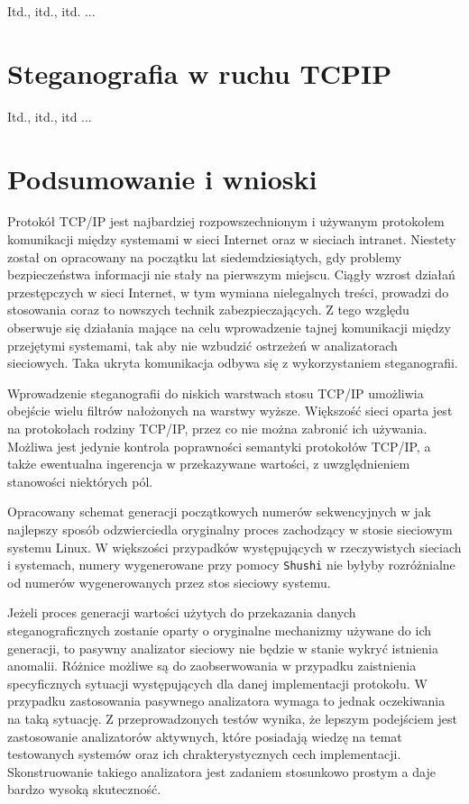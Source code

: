 \documentclass[a4paper,12pt,twoside,openany]{report}
\newcommand{\tech}{\texttt}
\begin{document}
Itd., itd., itd. ...

\chapter{Steganografia w ruchu TCPIP}
\label{chapterSteganografiaWRuchuTCPIP}

Itd., itd., itd ...
\fi
\chapter{Podsumowanie i wnioski }

\iffalse
Protokół TCP/IP jest najbardziej rozpowszechnionym i używanym protokołem 
komunikacji między systemami w sieci Internet oraz w sieciach intranet. Niestety 
został on opracowany na początku lat siedemdziesiątych, gdy problemy 
bezpieczeństwa informacji nie stały na pierwszym miejscu. Ciągły wzrost działań 
przestępczych w sieci Internet, w tym wymiana nielegalnych treści, prowadzi do 
stosowania coraz to nowszych technik zabezpieczających. Z tego względu obserwuje 
się działania mające na celu wprowadzenie tajnej komunikacji między przejętymi 
systemami, tak aby nie wzbudzić ostrzeżeń w analizatorach sieciowych. Taka 
ukryta komunikacja odbywa się z wykorzystaniem steganografii.

Wprowadzenie steganografii do niskich warstwach stosu TCP/IP umożliwia obejście 
wielu filtrów nałożonych na warstwy wyższe. Większość sieci oparta jest na 
protokołach rodziny TCP/IP, przez co nie można zabronić ich używania. Możliwa 
jest jedynie kontrola poprawności semantyki protokołów TCP/IP, a także 
ewentualna ingerencja w przekazywane wartości, z uwzględnieniem stanowości 
niektórych pól.

Opracowany schemat generacji początkowych numerów sekwencyjnych w jak najlepszy 
sposób odzwierciedla oryginalny proces zachodzący w stosie sieciowym systemu 
Linux. W większości przypadków występujących w rzeczywistych sieciach i 
systemach, numery wygenerowane przy pomocy \tech{Shushi} nie byłyby rozróżnialne 
od numerów wygenerowanych przez stos sieciowy systemu.

Jeżeli proces generacji wartości użytych do przekazania danych 
steganograficznych zostanie oparty o oryginalne mechanizmy używane do ich 
generacji, to pasywny analizator sieciowy nie będzie w stanie wykryć istnienia 
anomalii. Różnice możliwe są do zaobserwowania w przypadku zaistnienia 
specyficznych sytuacji występujących dla danej implementacji protokołu. W 
przypadku zastosowania pasywnego analizatora wymaga to jednak oczekiwania na 
taką sytuację. Z przeprowadzonych testów wynika, że lepszym podejściem jest 
zastosowanie analizatorów aktywnych, które posiadają wiedzę na temat testowanych 
systemów oraz ich chrakterystycznych cech implementacji. Skonstruowanie takiego 
analizatora jest zadaniem stosunkowo prostym a daje bardzo wysoką skuteczność.
\end{document}

